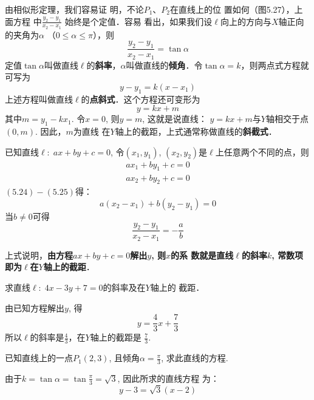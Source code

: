 由相似形定理，我们容易证
明，不论$P_1$、$P_2$在直线上的位
置如何（图5.27），上面方程
中$\frac{y_2-y_1}{x_2-x_1}$
始终是个定值．容易
看出，如果我们设$\ell$向上的方向与$X$轴正向的夹角为$\alpha$
（$0\le \alpha\le \pi$），则
\[\frac{y_2-y_1}{x_2-x_1}=\tan\alpha\]
定值$\tan\alpha$叫做直线$\ell$的\textbf{斜率}，$\alpha$叫做直线的\textbf{倾角}．令$\tan\alpha=k$，则两点式方程就可写为
\[y-y_1=k(x-x_1)\]
上述方程叫做直线$\ell$的\textbf{点斜式}．这个方程还可变形为
\[y=kx+m\]
其中$m=y_1-kx_1$. 令$x=0$, 则$y=m$, 这就是说直线：
$y=kx+m$与$Y$轴相交于点$(0,m)$. 因此，$m$为直线
在$Y$轴上的截距，上式通常称做直线的\textbf{斜截式}．

已知直线$\ell:\; ax+by+c=0$, 令$(x_1,y_1)$, 
$(x_2,y_2)$是$\ell$上任意两个不同的点，则
\begin{align}
    ax_1+by_1+c=0\\
ax_2+by_2+c=0
\end{align}
$(5.24)-(5.25)$得：
\[a(x_2-x_1)+b(y_2-y_1)=0\]
当$b\ne 0$可得
\[\frac{y_2-y_1}{x_2-x_1}=-\frac{a}{b}\]

上式说明，\textbf{由方程$ax+by+c=0$解出$y$, 则$x$的系
数就是直线$\ell$的斜率$k$, 常数项即为$\ell$在$Y$轴上的截距}．

\begin{example}
    求直线$\ell:\; 4x-3y+7=0$的斜率及在$Y$轴上的
截距．
\end{example}


\begin{solution}
   由已知方程解出$y$, 得
\[y=\frac{4}{3}x+\frac{7}{3}\]
所以$\ell$的斜率是$\frac{4}{3}$，在$Y$轴上的截距是
$\frac{7}{3}$.
\end{solution}

\begin{example}
已知直线上的一点$P_1(2,3)$, 且倾角$\alpha=\frac{\pi}{3}$, 
求此直线的方程.
\end{example}

\begin{solution}
    由于$k=\tan\alpha=\tan\frac{\pi}{3}=\sqrt{3}$, 因此所求的直线方程
为：
\[y-3=\sqrt{3}(x-2)\]
\end{solution}

